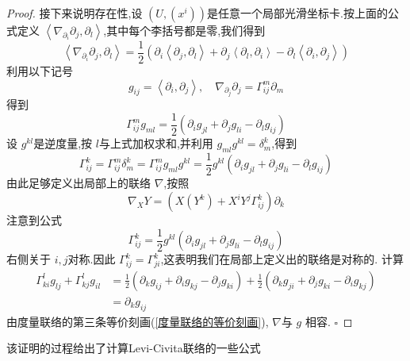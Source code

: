 \documentclass[../../几何与拓扑.tex]{subfiles}
\begin{document}
\begin{proof}
    接下来说明存在性,设 \(  \left( U,\left( x^{i} \right)  \right)   \)是任意一个局部光滑坐标卡.按上面的公式定义 \(  \left< \nabla _{\partial _{i}}\partial _{j},\partial _{l} \right>  \),其中每个李括号都是零,我们得到 
    \begin{equation}
        \left< \nabla _{\partial _{i}}\partial _{j},\partial _{l} \right>= \frac{1}{2}\left( \partial _{i}\left<\partial _{j},\partial _{l} \right>+ \partial _{j}\left<\partial _{l},\partial _i \right>-\partial _{l}\left<\partial _{i},\partial _{j} \right> \right) 
    \end{equation}利用以下记号 \[
    g_{ij}= \left<\partial _{i},\partial _{j} \right>,\quad  \nabla _{\partial _{j}}\partial _{j}=  \Gamma _{ij}^{m}\partial _{m}
    \]得到 \[
     \Gamma _{ij}^{m}g_{ml}= \frac{1 }{2 }\left( \partial _{i}g_{jl}+\partial _{j} g_{li}-\partial _{l} g_{ij} \right)  
    \]设 \(  g^{kl}  \)是逆度量,按 \(  l  \)与上式加权求和,并利用 \(  g_{ml}g^{kl}=  \delta  _{m}^{k}  \),得到 
    \begin{equation}
        \Gamma _{ij}^{k}=   \Gamma _{ij}^{m} \delta  _{m}^{k}= \Gamma _{ij}^{m}g_{ml}g^{kl}= \frac{1}{2}g^{kl}\left( \partial _{i}g_{jl}+ \partial _{j}g_{li}-\partial _{l}g_{ij} \right) 
    \end{equation}由此足够定义出局部上的联络 \(   \nabla   \),按照 \[
     \nabla _{X}Y= \left( X\left( Y^{k} \right)+ X^{i}Y^{j} \Gamma _{ij}^{k}  \right)\partial _{k} 
    \] 注意到公式 \begin{equation}
       \Gamma _{ij}^{k}=  \frac{1}{2}g^{kl}\left( \partial _{i}g_{jl}+ \partial _{j}g_{li}-\partial _{l}g_{ij} \right) 
    \end{equation}右侧关于 \(  i,j  \)对称.因此 \(   \Gamma _{ij}^{k}=  \Gamma _{ji}^{k}  \),这表明我们在局部上定义出的联络是对称的. 计算 \[
    \begin{aligned}
        \Gamma _{ki}^{l}g_{lj}+  \Gamma _{kj}^{l}g_{il} &=  \frac{1}{2}\left( \partial _{k}g_{ij}+ \partial _{i}g_{kj}-\partial _{j}g_{ki} \right)+ \frac{1}{2}\left( \partial _{k}g_{ji}+ \partial _{j}g_{ki}-\partial _{i}g_{kj} \right)\\ 
         & =  \partial _{k}g_{ij}
    \end{aligned}  
    \] 由度量联络的第三条等价刻画(\ref{度量联络的等价刻画}), \(   \nabla   \)与 \(  g  \)  相容.
    \hfill $\square$
\end{proof}

该证明的过程给出了计算Levi-Civita联络的一些公式
\end{document}
